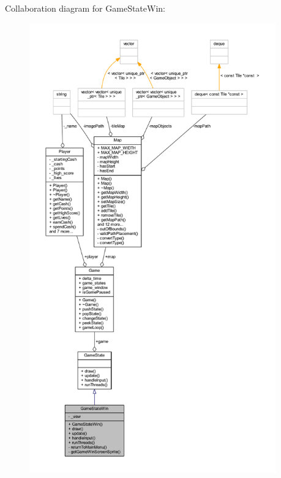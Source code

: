 Collaboration diagram for Game\+State\+Win\+:
\nopagebreak
\begin{figure}[H]
\begin{center}
\leavevmode
\includegraphics[height=550pt]{class_game_state_win__coll__graph}
\end{center}
\end{figure}
